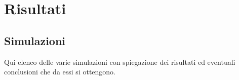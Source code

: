 \chapter{Risultati}

\section{Simulazioni}

Qui elenco delle varie simulazioni con spiegazione dei risultati ed eventuali conclusioni che da essi si ottengono.
